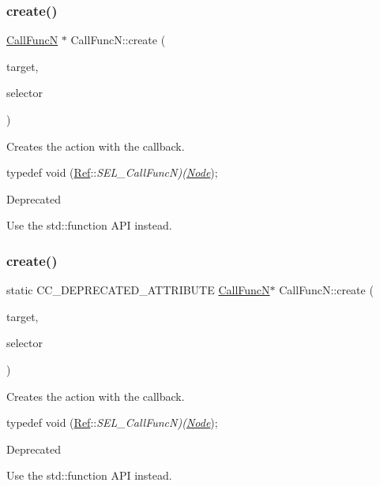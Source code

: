 \subsubsection{\texorpdfstring{create()}{create()}\hspace{0.1cm}{\footnotesize\ttfamily [3/4]}}
{\footnotesize\ttfamily \hyperlink{classCallFuncN}{Call\+FuncN} $\ast$ Call\+Func\+N\+::create (\begin{DoxyParamCaption}\item[{\hyperlink{classRef}{Ref} $\ast$}]{target,  }\item[{S\+E\+L\+\_\+\+Call\+FuncN}]{selector }\end{DoxyParamCaption})\hspace{0.3cm}{\ttfamily [static]}}

Creates the action with the callback.

typedef void (\hyperlink{classRef}{Ref}\+:\+:{\itshape S\+E\+L\+\_\+\+Call\+FuncN)(\hyperlink{classNode}{Node}}); \begin{DoxyRefDesc}{Deprecated}
\item[\hyperlink{deprecated__deprecated000015}{Deprecated}]Use the std\+::function A\+PI instead. \end{DoxyRefDesc}
\mbox{\label{classCallFuncN_a3d856e09f0544e717ac9ebf46daa77ed}} 
\subsubsection{\texorpdfstring{create()}{create()}\hspace{0.1cm}{\footnotesize\ttfamily [4/4]}}
{\footnotesize\ttfamily static C\+C\+\_\+\+D\+E\+P\+R\+E\+C\+A\+T\+E\+D\+\_\+\+A\+T\+T\+R\+I\+B\+U\+TE \hyperlink{classCallFuncN}{Call\+FuncN}$\ast$ Call\+Func\+N\+::create (\begin{DoxyParamCaption}\item[{\hyperlink{classRef}{Ref} $\ast$}]{target,  }\item[{S\+E\+L\+\_\+\+Call\+FuncN}]{selector }\end{DoxyParamCaption})\hspace{0.3cm}{\ttfamily [static]}}

Creates the action with the callback.

typedef void (\hyperlink{classRef}{Ref}\+:\+:{\itshape S\+E\+L\+\_\+\+Call\+FuncN)(\hyperlink{classNode}{Node}}); \begin{DoxyRefDesc}{Deprecated}
\item[\hyperlink{deprecated__deprecated000245}{Deprecated}]Use the std\+::function A\+PI instead. \end{DoxyRefDesc}
\mbox{\label{classCallFuncN_af75fea048afe561409f3d8b156eb1a12}} 
